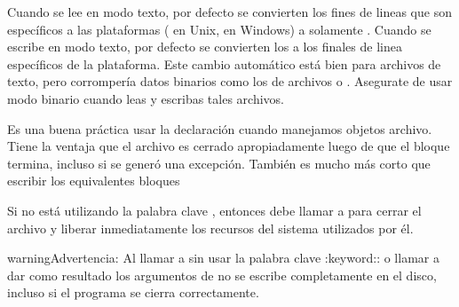 \documentclass[a5paper,10pt,spanish]{sphinxmanual}
\begin{document}
\sphinxAtStartPar
Cuando se lee en modo texto, por defecto se convierten los fines de lineas que son específicos a las plataformas ( en Unix,  en Windows) a solamente .  Cuando se escribe en modo texto, por defecto se convierten los  a los finales de linea específicos de la plataforma. Este cambio automático está bien para archivos de texto, pero corrompería datos binarios como los de archivos  o .  Asegurate de usar modo binario cuando leas y escribas tales archivos.

\sphinxAtStartPar
Es una buena práctica usar la declaración  cuando manejamos objetos archivo.  Tiene la ventaja que el archivo es cerrado apropiadamente luego de que el bloque termina, incluso si se generó una excepción.  También es mucho más corto que escribir los equivalentes bloques \sphinxhyphen{}

\begin{sphinxVerbatim}[commandchars=\\\{\}]
   
      

\end{sphinxVerbatim}

\sphinxAtStartPar
Si no está utilizando la palabra clave , entonces debe llamar a  para cerrar el archivo y liberar inmediatamente los recursos del sistema utilizados por él.

\begin{sphinxadmonition}{warning}{Advertencia:}
\sphinxAtStartPar
Al llamar a  sin usar la palabra clave :keyword:: o llamar a   dar como resultado los argumentos de  no se escribe completamente en el disco, incluso si el programa se cierra correctamente.
\end{sphinxadmonition}
\end{document}
